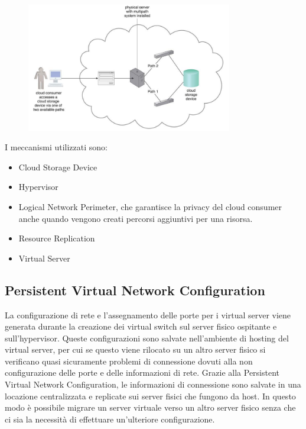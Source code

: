 \begin{figure}[htb!]
    \centering
    \includegraphics[width=9cm]{./Images/cap13/13.9.png}
\end{figure}

I meccanismi utilizzati sono:
\begin{itemize}
    \item Cloud Storage Device
    \item Hypervisor
    \item Logical Network Perimeter, che garantisce la privacy del cloud consumer anche quando vengono creati percorsi aggiuntivi per una risorsa.
    \item Resource Replication
    \item Virtual Server
\end{itemize}

\subsection{Persistent Virtual Network Configuration}
La configurazione di rete e l'assegnamento delle porte per i virtual server viene generata durante la creazione dei virtual switch sul server fisico ospitante e sull'hypervisor. Queste configurazioni sono salvate nell'ambiente di hosting del virtual server, per cui se questo viene rilocato su un altro server fisico si verificano quasi sicuramente problemi di connessione dovuti alla non configurazione delle porte e delle informazioni di rete. Grazie alla Persistent Virtual Network Configuration, le informazioni di connessione sono salvate in una locazione centralizzata e replicate sui server fisici che fungono da host. In questo modo è possibile migrare un server virtuale verso un altro server fisico senza che ci sia la necessità di effettuare un'ulteriore configurazione.

